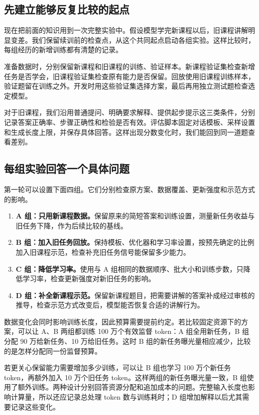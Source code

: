 \subsection{先建立能够反复比较的起点}

现在把前面的知识用到一次完整实验中。假设模型学完新课程以后，旧课程讲解明显变差。我们保留续训前的检查点，从这个共同起点启动各组实验。这样比较时，每组经历的新增训练都有清楚的记录。

准备数据时，分别保留新课程和旧课程的训练、验证样本。新课程验证集检查新增任务是否学会，旧课程验证集检查原有能力是否保留。回放使用旧课程训练样本，验证题留在训练之外。开发时用这些验证集选择方案，最后再用独立测试题检查选定模型。

对于旧课程，我们沿用普通提问、明确要求解释、提供起步提示这三类条件，分别记录答案正确率、步骤正确性和检验是否有效。评估脚本固定对话模板、采样设置和生成长度上限，并保存具体回答。这样出现分数变化时，我们能回到同一道题查看差别。

\subsection{每组实验回答一个具体问题}

第一轮可以设置下面四组。它们分别检查原方案、数据覆盖、更新强度和示范方式的影响。

\begin{enumerate}
    \item \textbf{A 组：只用新课程数据。}保留原来的简短答案和训练设置，测量新任务收益与旧任务下降，作为后续比较的基线。
    \item \textbf{B 组：加入旧任务回放。}保持模板、优化器和学习率设置，按预先确定的比例加入旧课程示范，检查补充旧任务信号能保留多少能力。
    \item \textbf{C 组：降低学习率。}使用与 A 组相同的数据顺序、批大小和训练步数，只降低学习率，检查更新强度对新旧任务的影响。
    \item \textbf{D 组：补全新课程示范。}保留新课程题目，把需要讲解的答案补成经过审核的推导，检查示范方式改变后，模型能否恢复合适的讲解行为。
\end{enumerate}

数据变化会同时影响训练长度，因此预算需要提前约定。若比较固定资源下的方案，可以让 A、B 两组都训练 100 万个有效监督 token：A 组全用新任务，B 组分配 90 万给新任务、10 万给旧任务。这时 B 组的新任务曝光量相应减少，比较的是怎样分配同一份监督预算。

若更关心保留能力需要增加多少训练，可以让 B 组也学习 100 万个新任务 token，再额外加入 10 万个旧任务 token。这样两组的新任务曝光量一致，B 组使用了额外训练。两种设计分别回答资源分配和追加成本的问题。完整输入长度也影响计算量，所以还应记录总处理 token 数与训练耗时；D 组增加解释以后尤其需要记录这些变化。

